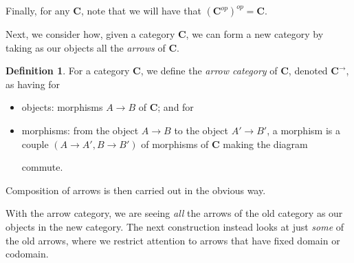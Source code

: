\documentclass[11pt]{book}
\theoremstyle{definition}
\theoremstyle{definition}
\newtheorem{definition}{Definition}[section]
\theoremstyle{definition}
\theoremstyle{theorem}
\theoremstyle{definition}
\begin{document}
Finally, for any $\textbf{C}$, note that we will have that $(\textbf{C}^{op})^{op} = \textbf{C}$. \par 
Next, we consider how, given a category $\textbf{C}$, we can form a new category by taking as our objects all the \textit{arrows} of $\textbf{C}$. 
	\begin{definition}
		For a category \textbf{C}, we define the \textit{arrow category}  of \textbf{C}, denoted $\textbf{C}^{\rightarrow}$, as having for 
		\begin{itemize}
			\item objects: morphisms $A \rightarrow B$ of $\textbf{C}$; and for 
			\item morphisms: from the object $A \rightarrow B$ to the object $A' \rightarrow B'$, a morphism is a couple $(A \rightarrow A', B \rightarrow B')$ of morphisms of $\textbf{C}$ making the diagram 
			\begin{center}
			\end{center}
			\par \noindent 
			commute. 
		\end{itemize}
	Composition of arrows is then carried out in the obvious way. 
	\end{definition} \noindent 
With the arrow category, we are seeing \textit{all} the arrows of the old category as our objects in the new category. The next construction instead looks at just \textit{some} of the old arrows, where we restrict attention to arrows that have fixed domain or codomain.
\end{document}
